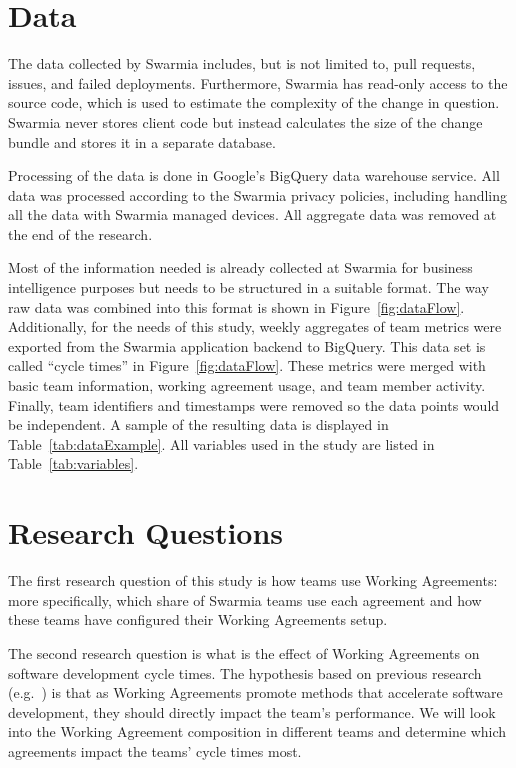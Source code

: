 \section{Data}

The data collected by Swarmia includes, but is not limited to, pull requests, issues, and failed deployments. Furthermore, Swarmia has read-only access to the source code, which is used to estimate the complexity of the change in question. Swarmia never stores client code but instead calculates the size of the change bundle and stores it in a separate database.



Processing of the data is done in Google's BigQuery data warehouse service. All data was processed according to the Swarmia privacy policies, including handling all the data with Swarmia managed devices. All aggregate data was removed at the end of the research.



Most of the information needed is already collected at Swarmia for business intelligence purposes but needs to be structured in a suitable format. The way raw data was combined into this format is shown in Figure~\ref{fig:dataFlow}. Additionally, for the needs of this study, weekly aggregates of team metrics were exported from the Swarmia application backend to BigQuery. This data set is called ``cycle times'' in Figure~\ref{fig:dataFlow}. These metrics were merged with basic team information, working agreement usage, and team member activity. Finally, team identifiers and timestamps were removed so the data points would be independent. A sample of the resulting data is displayed in Table~\ref{tab:dataExample}. All variables used in the study are listed in Table~\ref{tab:variables}.



\section{Research Questions}

The first research question of this study is how teams use Working Agreements: more specifically, which share of Swarmia teams use each agreement and how these teams have configured their Working Agreements setup. 

The second research question is what is the effect of Working Agreements on software development cycle times. The hypothesis based on previous research (e.g.~\cite{stray_exploring_2016,teh_social_2012,forsgren_space_2021}) is that as Working Agreements promote methods that accelerate software development, they should directly impact the team's performance. We will look into the Working Agreement composition in different teams and determine which agreements impact the teams' cycle times most. 

